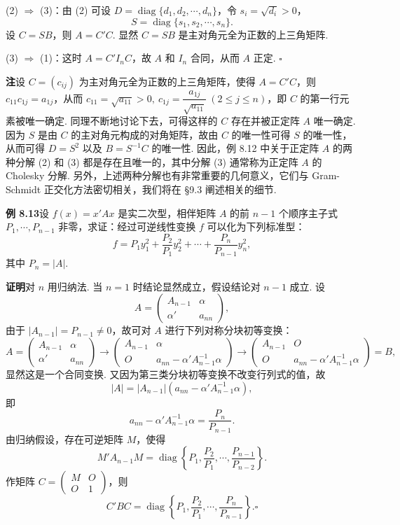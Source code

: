 \documentclass[UTF8, 12pt, fontset=fandol, oneside]{ctexart}
\begin{document}
(2) $\Rightarrow$ (3)：由 (2) 可设 $D=\operatorname{diag}\{d_1,d_2,\cdots,d_n\}$，令 $s_i=\sqrt{d_i}>0$，
\[
S=\operatorname{diag}\{s_1,s_2,\cdots,s_n\}.
\]
设 $C=SB$，则 $A=C'C$. 显然 $C=SB$ 是主对角元全为正数的上三角矩阵.

(3) $\Rightarrow$ (1)：这时 $A=C'I_nC$，故 $A$ 和 $I_n$ 合同，从而 $A$ 正定. $\ensuremath{\square}$

\noindent\textbf{注}\quad 设 $C=(c_{ij})$ 为主对角元全为正数的上三角矩阵，使得 $A=C'C$，则 $c_{11}c_{1j}=a_{1j}$，从而 $c_{11}=\sqrt{a_{11}}>0,\ c_{1j}=\dfrac{a_{1j}}{\sqrt{a_{11}}}\ (2\le j\le n)$，即 $C$ 的第一行元素被唯一确定. 同理不断地讨论下去，可得这样的 $C$ 存在并被正定阵 $A$ 唯一确定. 因为 $S$ 是由 $C$ 的主对角元构成的对角矩阵，故由 $C$ 的唯一性可得 $S$ 的唯一性，从而可得 $D=S^2$ 以及 $B=S^{-1}C$ 的唯一性. 因此，例 8.12 中关于正定阵 $A$ 的两种分解 (2) 和 (3) 都是存在且唯一的，其中分解 (3) 通常称为正定阵 $A$ 的 Cholesky 分解. 另外，上述两种分解也有非常重要的几何意义，它们与 Gram-Schmidt 正交化方法密切相关，我们将在 §9.3 阐述相关的细节.

\noindent\textbf{例 8.13}\quad 设 $f(x)=x'Ax$ 是实二次型，相伴矩阵 $A$ 的前 $n-1$ 个顺序主子式 $P_1,\cdots,P_{n-1}$ 非零，求证：经过可逆线性变换 $f$ 可以化为下列标准型：
\[
f=P_1y_1^2+\frac{P_2}{P_1}y_2^2+\cdots+\frac{P_n}{P_{n-1}}y_n^2,
\]
其中 $P_n=|A|$.

\noindent\textbf{证明}\quad 对 $n$ 用归纳法. 当 $n=1$ 时结论显然成立，假设结论对 $n-1$ 成立. 设
\[
A=\left(\begin{array}{cc}
A_{n-1} & \alpha\\
\alpha' & a_{nn}
\end{array}\right),
\]
由于 $|A_{n-1}|=P_{n-1}\ne 0$，故可对 $A$ 进行下列对称分块初等变换：
\[
A=\left(\begin{array}{cc}
A_{n-1} & \alpha\\
\alpha' & a_{nn}
\end{array}\right)
\to
\left(\begin{array}{cc}
A_{n-1} & \alpha\\
O & a_{nn}-\alpha'A_{n-1}^{-1}\alpha
\end{array}\right)
\to
\left(\begin{array}{cc}
A_{n-1} & O\\
O & a_{nn}-\alpha'A_{n-1}^{-1}\alpha
\end{array}\right)=B,
\]
显然这是一个合同变换. 又因为第三类分块初等变换不改变行列式的值，故
\[
|A|=|A_{n-1}|(a_{nn}-\alpha'A_{n-1}^{-1}\alpha),
\]
即
\[
a_{nn}-\alpha'A_{n-1}^{-1}\alpha=\frac{P_n}{P_{n-1}}.
\]
由归纳假设，存在可逆矩阵 $M$，使得
\[
M'A_{n-1}M=\operatorname{diag}\left\{P_1,\frac{P_2}{P_1},\cdots,\frac{P_{n-1}}{P_{n-2}}\right\}.
\]
作矩阵 $C=\left(\begin{array}{cc}M&O\\ O&1\end{array}\right)$，则
\[
C'BC=\operatorname{diag}\left\{P_1,\frac{P_2}{P_1},\cdots,\frac{P_n}{P_{n-1}}\right\}. \ensuremath{\square}
\]
\end{document}

